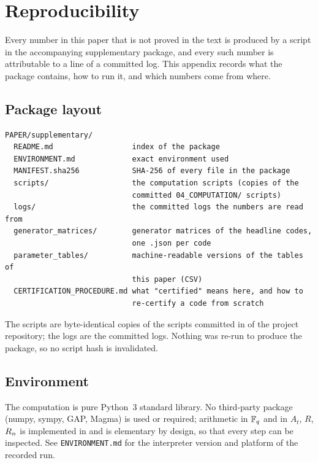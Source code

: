 \section{Reproducibility}
\label{app:repro}

Every number in this paper that is not proved in the text is produced by a
script in the accompanying supplementary package, and every such number is
attributable to a line of a committed log. This appendix records what the
package contains, how to run it, and which numbers come from where.

\subsection{Package layout}

\begin{verbatim}
PAPER/supplementary/
  README.md                  index of the package
  ENVIRONMENT.md             exact environment used
  MANIFEST.sha256            SHA-256 of every file in the package
  scripts/                   the computation scripts (copies of the
                             committed 04_COMPUTATION/ scripts)
  logs/                      the committed logs the numbers are read from
  generator_matrices/        generator matrices of the headline codes,
                             one .json per code
  parameter_tables/          machine-readable versions of the tables of
                             this paper (CSV)
  CERTIFICATION_PROCEDURE.md what "certified" means here, and how to
                             re-certify a code from scratch
\end{verbatim}

The scripts are byte-identical copies of the scripts committed in
 of the project repository; the logs are the
committed logs. Nothing was re-run to produce the package, so no script hash
is invalidated.

\subsection{Environment}

The computation is pure Python~3 standard library. No third-party package
(numpy, sympy, GAP, Magma) is used or required; arithmetic in $\mathbb F_q$ and in
$A_t$, $R$, $R_n$ is implemented in  and is
elementary by design, so that every step can be inspected. See
\texttt{ENVIRONMENT.md} for the interpreter version and platform of the
recorded run.


